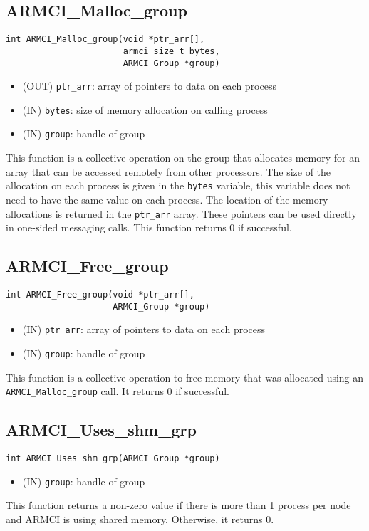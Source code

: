 \documentclass[12pt]{article}
\begin{document}
\subsection{ARMCI\_Malloc\_group}
\begin{verbatim}
int ARMCI_Malloc_group(void *ptr_arr[],
                       armci_size_t bytes,
                       ARMCI_Group *group)
\end{verbatim}
\begin{itemize}
\item (OUT) \texttt{ptr\_arr}: array of pointers to data on each process
\item (IN) \texttt{bytes}: size of memory allocation on calling process
\item (IN) \texttt{group}: handle of group
\end{itemize}
This function is a collective operation on the group that allocates memory for
an array that can be accessed remotely from other processors. The size of the
allocation on each process is given in the \texttt{bytes} variable, this
variable does not need to have the same value on each process. The location of
the memory allocations is returned in the \texttt{ptr\_arr} array. These
pointers can be used directly in one-sided messaging calls. This function
returns 0 if successful.

\subsection{ARMCI\_Free\_group}
\begin{verbatim}
int ARMCI_Free_group(void *ptr_arr[],
                     ARMCI_Group *group)
\end{verbatim}
\begin{itemize}
\item (IN) \texttt{ptr\_arr}: array of pointers to data on each process
\item (IN) \texttt{group}: handle of group
\end{itemize}
This function is a collective operation to free memory that was allocated using
an \texttt{ARMCI\_Malloc\_group} call. It returns 0 if successful.

\subsection{ARMCI\_Uses\_shm\_grp}
\begin{verbatim}
int ARMCI_Uses_shm_grp(ARMCI_Group *group)
\end{verbatim}
\begin{itemize}
\item (IN) \texttt{group}: handle of group
\end{itemize}
This function returns a non-zero value if there is more than 1 process per node
and ARMCI is using shared memory. Otherwise, it returns 0.
\end{document}
